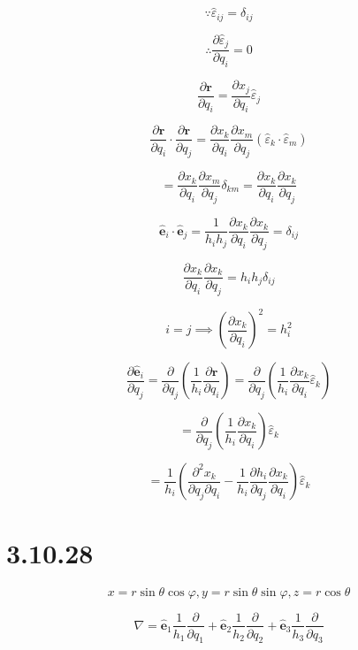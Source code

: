 \documentclass[12pt]{article}
\begin{document}
\[
    \because  \hat{\varepsilon}_{ij} = \delta_{ij}
\]

\[
    \therefore \frac{\partial \hat{\varepsilon}_j}{\partial q_i} = 0
\]

\[
    \frac{\partial \textbf{r}}{\partial q_i} = \frac{\partial x_j}{\partial q_i} \hat{\varepsilon}_j
\]

\[
    \frac{\partial \textbf{r}}{\partial q_i} \cdot \frac{\partial \textbf{r}}{\partial q_j} = \frac{\partial x_k}{\partial q_i} \frac{\partial x_m}{\partial q_j} \left(\hat{\varepsilon}_k \cdot \hat{\varepsilon}_m\right)
\]

\[
    = \frac{\partial x_k}{\partial q_i} \frac{\partial x_m}{\partial q_j} \delta_{km} = \frac{\partial x_k}{\partial q_i} \frac{\partial x_k}{\partial q_j}
\]

\[
    \hat{\textbf{e}}_i \cdot \hat{\textbf{e}}_j = \frac{1}{h_i h_j} \frac{\partial x_k}{\partial q_i} \frac{\partial x_k}{\partial q_j} = \delta_{ij}
\]

\[
    \frac{\partial x_k}{\partial q_i} \frac{\partial x_k}{\partial q_j} = h_i h_j \delta_{ij}
\]

\[
    i = j \implies {\left(\frac{\partial x_k}{\partial q_i}\right)}^2 = h_i^2
\]

\[
    \frac{\partial \hat{\textbf{e}}_i}{\partial q_j} = \frac{\partial}{\partial q_j} \left(\frac{1}{h_i} \frac{\partial \textbf{r}}{\partial q_i}\right) = \frac{\partial}{\partial q_j} \left(\frac{1}{h_i} \frac{\partial x_k}{\partial q_i} \hat{\varepsilon}_k\right)
\]

\[
    = \frac{\partial}{\partial q_j} \left(\frac{1}{h_i} \frac{\partial x_k}{\partial q_i}\right) \hat{\varepsilon}_k
\]

\[
    = \frac{1}{h_i} \left(\frac{\partial^2 x_k}{\partial q_j \partial q_i} - \frac{1}{h_i} \frac{\partial h_i}{\partial q_j} \frac{\partial x_k}{\partial q_i}\right) \hat{\varepsilon}_k
\]

\section{3.10.28}

\[
    x = r \sin{\theta} \cos{\varphi}, y = r \sin{\theta} \sin{\varphi}, z = r \cos{\theta}
\]

\[
    \nabla = \hat{\textbf{e}}_1 \frac{1}{h_1} \frac{\partial}{\partial q_1} + \hat{\textbf{e}}_2 \frac{1}{h_2} \frac{\partial}{\partial q_2} + \hat{\textbf{e}}_3 \frac{1}{h_3} \frac{\partial}{\partial q_3}
\]
\end{document}
